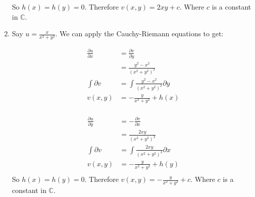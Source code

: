 \begin{example}
\begin{enumerate}
              So $h(x) = h(y) = 0$. Therefore $v(x,y) = 2xy + c$. Where $c$ is a constant in $\mathbb{C}$.
        \item Say $u = \frac{x}{x^2+y^2}$. We can apply the Cauchy-Riemann equations to get:

              \begin{align*}
                  \frac{\partial u}{\partial x} & = \frac{\partial v}{\partial y}               \\
                                                & = \frac{y^2-x^2}{(x^2+y^2)^2}                 \\
                  \int \partial v               & = \int \frac{y^2-x^2}{(x^2+y^2)^2} \partial y \\
                  v (x,y)                       & = -\frac{y}{x^2+y^2} + h(x)                   \\
              \end{align*}

              \begin{align*}
                  \frac{\partial u}{\partial y} & = -\frac{\partial v}{\partial x}          \\
                                                & = \frac{2xy}{(x^2+y^2)^2}                 \\
                  \int \partial v               & = \int \frac{2xy}{(x^2+y^2)^2} \partial x \\
                  v (x,y)                       & = -\frac{y}{x^2+y^2} + h(y)               \\
              \end{align*}
              So $h(x) = h(y) = 0$. Therefore $v(x,y) = -\frac{y}{x^2+y^2} + c$. Where $c$ is a constant in $\mathbb{C}$.
    \end{enumerate}
\end{example}

